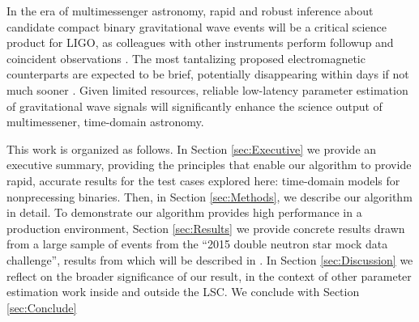 In the era of multimessenger astronomy, rapid and robust inference about candidate compact binary gravitational wave
events will be a critical science product for LIGO, as  colleagues with other instruments  perform followup and
coincident observations \cite{LIGO-2013-WhitePaper-CoordinatedEMObserving}.  
%
The most tantalizing proposed electromagnetic counterparts are expected to be brief, potentially disappearing within
days if not much
sooner \cite{2012ApJ...746...48M,2014MNRAS.439..757G,2014MNRAS.437L...6K,2014MNRAS.437.1821M,2014ApJ...780...31T,2013ApJ...775...18B}.  
%
Given limited resources, reliable low-latency parameter estimation of gravitational wave signals will significantly enhance the science output of
multimessener, time-domain astronomy.  

% 


This work is organized as follows.
In Section \ref{sec:Executive} we provide an executive summary, providing the principles that enable our algorithm to
provide rapid, accurate results for the test cases explored here:  time-domain models for nonprecessing binaries.  
%
Then, in Section \ref{sec:Methods}, we describe our algorithm in detail.  
%
To demonstrate  our algorithm provides high performance in a production environment,  Section \ref{sec:Results} we
provide concrete results drawn from a large sample of events from the ``2015 double neutron star mock data challenge'',
results from which will be described in .  
%
In Section \ref{sec:Discussion} we reflect on the broader significance of our result, in the context of other parameter
estimation work inside and outside the LSC.  
%
We conclude with Section \ref{sec:Conclude}
